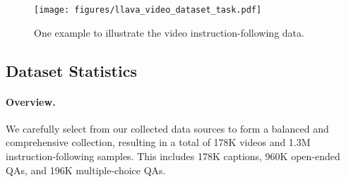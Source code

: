 \begin{figure}[t]
\centering
\texttt{[image: figures/llava\_video\_dataset\_task.pdf]}
\caption{One example to illustrate the video instruction-following data.}
\label{fig:annotation_example}
\end{figure}

\subsection{Dataset Statistics}
\paragraph{Overview.} 
We carefully select from our collected data sources to form a balanced and comprehensive collection, resulting in a total of 178K videos and 1.3M instruction-following samples. This includes 178K captions, 960K open-ended QAs, and 196K multiple-choice QAs. 


